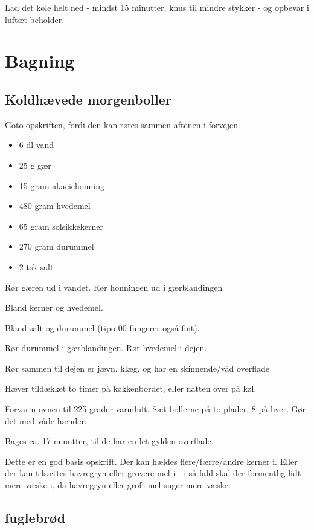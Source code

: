 \documentclass[
]{book}
\providecommand{\tightlist}{%
  \setlength{\itemsep}{0pt}\setlength{\parskip}{0pt}}
\begin{document}
Lad det køle helt ned - mindst 15 minutter, knus til mindre stykker - og opbevar i luftæt beholder.

\hypertarget{bagning}{%
\chapter{Bagning}\label{bagning}}

\hypertarget{koldhuxe6vede-morgenboller}{%
\section{Koldhævede morgenboller}\label{koldhuxe6vede-morgenboller}}

Goto opskriften, fordi den kan røres sammen aftenen i forvejen.

\begin{itemize}
\tightlist
\item
  6 dl vand
\item
  25 g gær
\item
  15 gram akaciehonning
\item
  480 gram hvedemel
\item
  65 gram solsikkekerner
\item
  270 gram durummel
\item
  2 tsk salt
\end{itemize}

Rør gæren ud i vandet.
Rør honningen ud i gærblandingen

Bland kerner og hvedemel.

Bland salt og durummel (tipo 00 fungerer også fint).

Rør durummel i gærblandingen.
Rør hvedemel i dejen.

Rør sammen til dejen er jævn, klæg, og har en skinnende/våd
overflade

Hæver tildækket to timer på køkkenbordet, eller natten over
på køl.

Forvarm ovnen til 225 grader varmluft. Sæt bollerne på to
plader, 8 på hver. Gør det med våde hænder.

Bages ca. 17 minutter, til de har en let gylden overflade.

Dette er en god basis opskrift. Der kan hældes flere/færre/andre
kerner i. Eller der kan tilsættes havregryn eller grovere
mel i - i så fald skal der formentlig lidt mere væske i, da
havregryn eller groft mel suger mere væske.

\hypertarget{fuglebruxf8d}{%
\section{fuglebrød}\label{fuglebruxf8d}}
\end{document}

